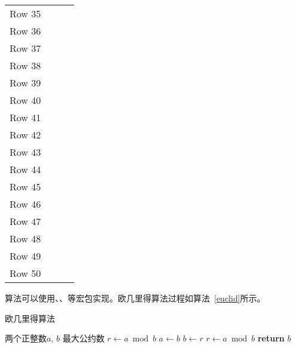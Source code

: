 \begin{longtable}{cccc}
	Row 35 & & & \\
	Row 36 & & & \\
	Row 37 & & & \\
	Row 38 & & & \\
	Row 39 & & & \\
	Row 40 & & & \\
	Row 41 & & & \\
	Row 42 & & & \\
	Row 43 & & & \\
	Row 44 & & & \\
	Row 45 & & & \\
	Row 46 & & & \\
	Row 47 & & & \\
	Row 48 & & & \\
	Row 49 & & & \\
	Row 50 & & & \\
\end{longtable}

算法可以使用、、等宏包实现。欧几里得算法过程如算法~\ref{euclid}所示。
\begin{algorithm}[!htb]
	\caption{欧几里得算法}
	\label{euclid}
	\begin{algorithmic}[1]
		\Require 两个正整数$a$, $b$
		\Ensure 最大公约数
		\State $r \gets a \bmod b$
		\State $a \gets b$
		\State $b \gets r$
		\State $r \gets a \bmod b$
		\EndWhile\label{euclidendwhile}
		\State \textbf{return} $b$
		\EndProcedure
	\end{algorithmic}
\end{algorithm}